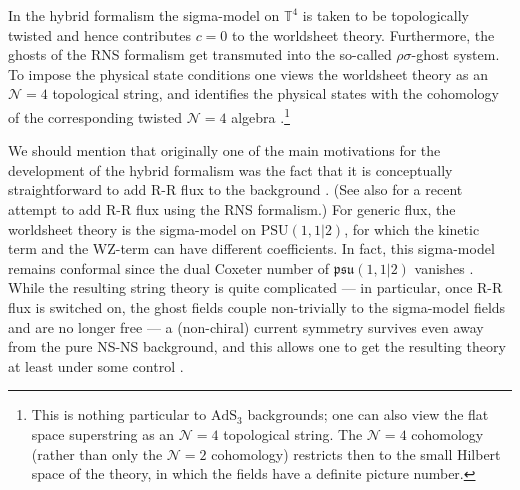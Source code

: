 \documentclass[12pt,a4paper]{article}
\begin{document}
In the hybrid formalism the sigma-model on $\mathbb{T}^4$ is taken to be topologically twisted and hence contributes $c=0$ to the worldsheet theory. Furthermore, the ghosts of the RNS formalism get transmuted into the so-called $\rho\sigma$-ghost system. To impose the physical state conditions one views the worldsheet theory as an $\mathcal{N}=4$ topological string, and identifies the physical states with the cohomology of the corresponding twisted $\mathcal{N}=4$ algebra \cite{Berkovits:1999im}.\footnote{This is nothing particular to $\mathrm{AdS}_3$ backgrounds; one can also view the flat space superstring as an $\mathcal{N}=4$ topological string. The $\mathcal{N}=4$ cohomology (rather than only the $\mathcal{N}=2$ cohomology) restricts then to the small Hilbert space of the theory, in which the fields have a definite picture number.}

We should mention that originally one of the main motivations for the development of the hybrid formalism was 
the fact that it is conceptually straightforward to add R-R flux to the background \cite{Berkovits:1999im}. (See also \cite{Cho:2018nfn} for a recent attempt to add R-R flux using the RNS formalism.) For generic flux, the worldsheet theory is the sigma-model on $\mathrm{PSU}(1,1|2)$, for which the kinetic term and the WZ-term can have different coefficients. In fact, this sigma-model remains conformal since the dual Coxeter number  of $\mathfrak{psu}(1,1|2)$ vanishes \cite{Berkovits:1999im, Bershadsky:1999hk}. While the resulting string theory is quite complicated --- in particular, once R-R flux is switched on, the ghost fields couple non-trivially to the sigma-model fields and are no longer free --- a (non-chiral) current symmetry survives \cite{ Ashok:2009xx, Benichou:2010rk} even away from the pure NS-NS background, and this allows one to get the resulting theory at least under some control \cite{Eberhardt:2018exh,Eberhardt:2018vho}.
\end{document}
